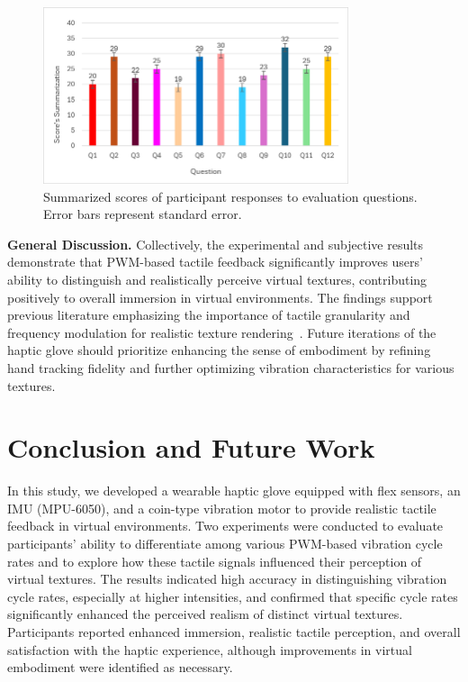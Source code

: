 \documentclass[graybox]{svmult}
\begin{document}
\begin{figure}\centering
	\includegraphics[width=0.8\textwidth]{figure/quetion_result.png}%
	\caption{Summarized scores of participant responses to evaluation questions. Error bars represent standard error.}\label{fig:questionnaire_results}
\end{figure}

\textbf{General Discussion.}  
Collectively, the experimental and subjective results demonstrate that PWM-based tactile feedback significantly improves users' ability to distinguish and realistically perceive virtual textures, contributing positively to overall immersion in virtual environments. The findings support previous literature emphasizing the importance of tactile granularity and frequency modulation for realistic texture rendering~\cite{strohmeier2017generating,bach2023enhanced}. Future iterations of the haptic glove should prioritize enhancing the sense of embodiment by refining hand tracking fidelity and further optimizing vibration characteristics for various textures.


\section{Conclusion and Future Work}

In this study, we developed a wearable haptic glove equipped with flex sensors, an IMU (MPU-6050), and a coin-type vibration motor to provide realistic tactile feedback in virtual environments. Two experiments were conducted to evaluate participants' ability to differentiate among various PWM-based vibration cycle rates and to explore how these tactile signals influenced their perception of virtual textures. The results indicated high accuracy in distinguishing vibration cycle rates, especially at higher intensities, and confirmed that specific cycle rates significantly enhanced the perceived realism of distinct virtual textures. Participants reported enhanced immersion, realistic tactile perception, and overall satisfaction with the haptic experience, although improvements in virtual embodiment were identified as necessary.
\end{document}

